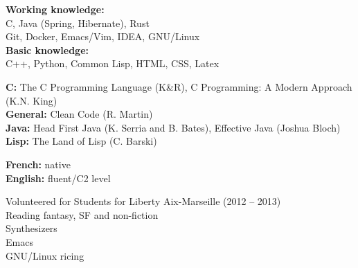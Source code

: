 \documentclass[10pt]{cv}
\begin{document}
\begin{minipage}[t]{0.49\textwidth}
\textbf{Working knowledge:}\\[0.5ex]
C, Java (Spring, Hibernate), Rust\\[0.5ex]
Git, Docker, Emacs/Vim, IDEA, GNU/Linux\\[1.2ex]
\textbf{Basic knowledge:}\\[0.5ex]
C++, Python, Common Lisp, HTML, CSS, Latex
\end{minipage}
\hfill
%
%
\begin{minipage}[t]{0.49\textwidth}
\textbf{C:} The C Programming Language (K\&R), C Programming: A Modern Approach (K.N. King)\\[1.2ex]
\textbf{General:} Clean Code (R. Martin)\\[1.2ex]
\textbf{Java:} Head First Java (K. Serria and B. Bates), Effective Java (Joshua Bloch)\\[1.2ex]
\textbf{Lisp:} The Land of Lisp (C. Barski)
\end{minipage}


\begin{minipage}[t]{0.49\textwidth}
\textbf{French:} native\\[1.5ex]
\textbf{English:} fluent/C2 level
\end{minipage}
\hfill
%
%
\begin{minipage}[t]{0.49\textwidth}
Volunteered for Students for Liberty Aix-Marseille (2012 -- 2013)\\[0.5ex]
Reading fantasy, SF and non-fiction\\[0.5ex]
Synthesizers\\[0.5ex]
Emacs\\[0.5ex]
GNU/Linux ricing


\end{minipage}
\end{document}
